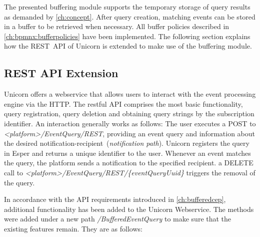 The presented buffering module supports the temporary storage of query results as demanded by \autoref{ch:concept}. After query creation, matching events can be stored in a buffer to be retrieved when necessary.
All buffer policies described in \autoref{ch:bpmnx:bufferpolicies} have been implemented.
The following section explains how the \acs{REST}~\acs{API} of Unicorn is extended to make use of the buffering module.

\subsection{REST API Extension}
Unicorn offers a webservice that allows users to interact with the event processing engine via the \ac{HTTP}.
The restful API comprises the most basic functionality, query registration, query deletion and obtaining query strings by the subscription identifier.
An interaction generally works as follows: The user executes a POST to \textit{<platform>/EventQuery/REST}, providing an event query and information about the desired notification-recipient~(\textit{notification path}). Unicorn registers the query in Esper and returns a unique identifier to the user.
Whenever an event matches the query, the platform sends a notification to the specified recipient. a DELETE call to \textit{<platform>/EventQuery/REST/\{eventQueryUuid\}} triggers the removal of the query.

In accordance with the API requirements introduced in \autoref{ch:bufferedcep}, additional functionality has been added to the Unicorn Webservice.
The methods were added under a new path \textit{/BufferedEventQuery} to make sure that the existing features remain. They are as follows:

